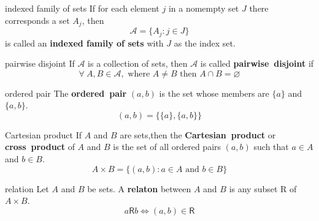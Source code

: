 \documentclass[avery5371,grid]{flashcards}
\begin{document}
\begin{flashcard}[Definition]{indexed family of sets}
If for each element $j$ in a nomempty set $J$
there corresponds a set $A_{j}$, then
\begin{equation*}
\mathscr{A} = \{ A_{j} : j \in J \}
\end{equation*}
is called an \textbf{indexed family of sets} with $J$ as the index set.
\end{flashcard}

\begin{flashcard}[Definition]{pairwise disjoint}
If $\mathscr{A}$ is a collection of sets, then $\mathscr{A}$ is called
\mbox{\textbf{pairwise disjoint}} if 
\begin{equation*}
\forall \ A,B \in \mathscr{A}, \textrm{ where } A \neq B
\textrm{ then } A \cap B  = \varnothing
\end{equation*}
\end{flashcard}


\begin{flashcard}[Definition]{ordered pair}
The \mbox{\textbf{ordered pair}}  $(a,b)$ is the set whose members are
$\{ a \}$ and $\{ a, b \}$.
\begin{equation*}
(a,b) = \{ \{a \} , \{ a,b \} \}
\end{equation*}
\end{flashcard}

\begin{flashcard}[Definition]{Cartesian product}
If $A$ and $B$ are sets,then the \mbox{\textbf{Cartesian product}} or
\mbox{\textbf{cross product}} of $A$ and $B$ is the set of all ordered
pairs $(a,b)$ such that $a \in A$ and $b \in B$.
\begin{equation*}
A \times B = \{ (a,b) : a \in A \textrm{ and } b \in B \}
\end{equation*}
\end{flashcard}

\begin{flashcard}[Definition]{relation}
Let $A$ and $B$ be sets.  A \mbox{\textbf{relaton}} between
$A$ and $B$ is any subset \textsf{R} of $A \times B$.
\begin{equation*}
a \textsf{R} b \Leftrightarrow (a,b) \in \textsf{R}
\end{equation*}
\end{flashcard}
\end{document}
